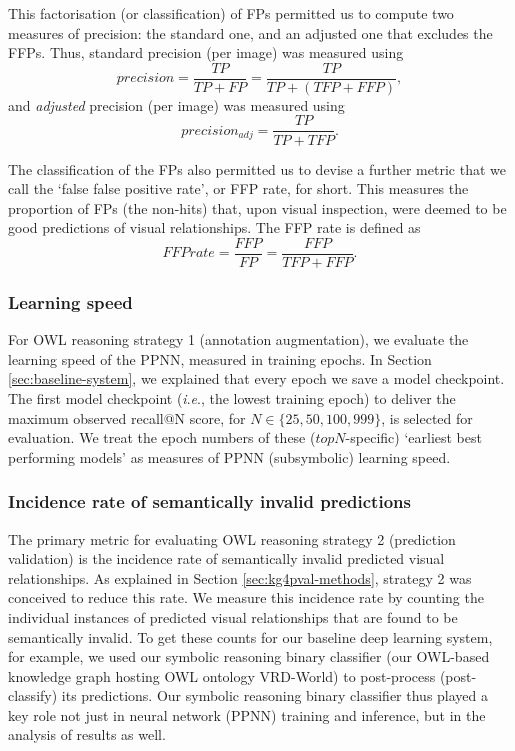 \documentclass[]{jair}
\newcommand{\ie}{\textit{i}.\textit{e}.,\xspace}
\begin{document}
This factorisation (or classification) of FPs permitted us to compute two measures of precision: the standard one, and an adjusted one that excludes the FFPs.
Thus, standard precision (per image) was measured using
\begin{displaymath}
  precision = \frac{TP}{TP + FP} = \frac{TP}{TP + (TFP + FFP)}, 
\end{displaymath}
and \emph{adjusted} precision (per image) was measured using
\begin{displaymath}
  precision_{adj} = \frac{TP}{TP + TFP}.
\end{displaymath}

The classification of the FPs also permitted us to devise a further metric that we call the `false false positive rate', or FFP rate, for short.
This measures the proportion of FPs (the non-hits) that, upon visual inspection, were deemed to be good predictions of visual relationships.
The FFP rate is defined as
\begin{displaymath}
  FFPrate = \frac{FFP}{FP} = \frac{FFP}{TFP + FFP}.
\end{displaymath}

\subsubsection{Learning speed}
For OWL reasoning strategy 1 (annotation augmentation), we evaluate the learning speed of the PPNN, measured in training epochs.
In Section \ref{sec:baseline-system}, we explained that every epoch we save a model checkpoint.
The first model checkpoint (\ie the lowest training epoch) to deliver the maximum observed recall@N score, for $N \in \{25, 50, 100, 999\}$, is selected for evaluation.
We treat the epoch numbers of these ($topN$-specific) `earliest best performing models' as measures of PPNN (subsymbolic) learning speed.

\subsubsection{Incidence rate of semantically invalid predictions}
The primary metric for evaluating OWL reasoning strategy 2 (prediction validation) is the incidence rate of semantically invalid predicted visual relationships.
As explained in Section \ref{sec:kg4pval-methods}, strategy 2 was conceived to reduce this rate.
We measure this incidence rate by counting the individual instances of predicted visual relationships that are found to be semantically invalid.
To get these counts for our baseline deep learning system, for example, we used our symbolic reasoning binary classifier (our OWL-based knowledge graph hosting OWL ontology VRD-World) to post-process (post-classify) its predictions.
Our symbolic reasoning binary classifier thus played a key role not just in neural network (PPNN) training and inference, but in the analysis of results as well. 
\end{document}
